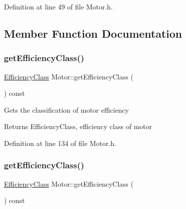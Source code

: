 Definition at line 49 of file Motor.\+h.



\subsection{Member Function Documentation}
\mbox{\label{class_motor_a5d0078bdc164e5ed14334373f183be55}} 
\subsubsection{\texorpdfstring{get\+Efficiency\+Class()}{getEfficiencyClass()}\hspace{0.1cm}{\footnotesize\ttfamily [1/3]}}
{\footnotesize\ttfamily \hyperlink{class_motor_afa022971ae062406a9f588c601673d4e}{Efficiency\+Class} Motor\+::get\+Efficiency\+Class (\begin{DoxyParamCaption}{ }\end{DoxyParamCaption}) const\hspace{0.3cm}{\ttfamily [inline]}}

Gets the classification of motor efficiency

\begin{DoxyReturn}{Returns}
Efficiency\+Class, efficiency class of motor 
\end{DoxyReturn}


Definition at line 134 of file Motor.\+h.

\mbox{\label{class_motor_a5d0078bdc164e5ed14334373f183be55}} 
\subsubsection{\texorpdfstring{get\+Efficiency\+Class()}{getEfficiencyClass()}\hspace{0.1cm}{\footnotesize\ttfamily [2/3]}}
{\footnotesize\ttfamily \hyperlink{class_motor_afa022971ae062406a9f588c601673d4e}{Efficiency\+Class} Motor\+::get\+Efficiency\+Class (\begin{DoxyParamCaption}{ }\end{DoxyParamCaption}) const\hspace{0.3cm}{\ttfamily [inline]}}

